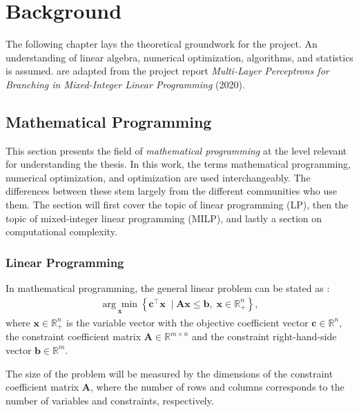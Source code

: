 \chapter{Background}\label{cha:background}

The following chapter lays the theoretical groundwork for the project. An understanding of linear algebra, numerical optimization, algorithms, and statistics is assumed.  are adapted from the project report \textit{Multi-Layer Perceptrons for Branching in Mixed-Integer Linear Programming} (2020). 


\section{Mathematical Programming}\label{sec:back_mathprog}

This section presents the field of \textit{mathematical programming} at the level relevant for understanding the thesis.
In this work, the terms mathematical programming, numerical optimization, and optimization are used interchangeably. The differences between these stem largely from the different communities who use them. The section will first cover the topic of linear programming (\gls{LP}), then the topic of mixed-integer linear programming (\gls{MILP}), and lastly a section on computational complexity.  


\subsection{Linear Programming}

In mathematical programming, the general linear problem can be stated as \cite{gasse2019exact}:
\begin{align} \label{eq:lp}
    \underset{\mathbf{x}}{\arg \min }\left\{\mathbf{c}^{\top} \mathbf{x} \; \mid \mathbf{A} \mathbf{x} \leq \mathbf{b},\; \mathbf{x} \in \mathbb{R}_+^{n}\right\},
\end{align}
where $ \mathbf{x} \in \mathbb{R}_+^n$ is the variable vector
with the objective coefficient vector $\mathbf{c} \in \mathbb{R}^n $, 
the constraint coefficient matrix $\mathbf{A} \in \mathbb{R}^{m \times n}$
and the constraint right-hand-side vector $\mathbf{b} \in \mathbb{R}^m $.

The size of the problem will be measured by the dimensions of the constraint coefficient matrix $ \mathbf{A} $, where the number of rows and columns corresponds to the number of variables and constraints, respectively.

